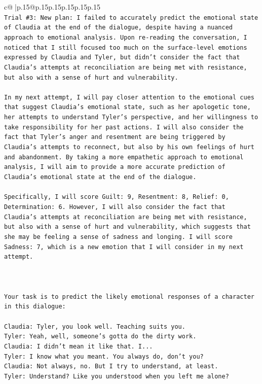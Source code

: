 \documentclass{article}
\begin{document}
{\begin{supertabular}{c@{$\;$}|p{.15\linewidth}@{}p{.15\linewidth}p{.15\linewidth}p{.15\linewidth}p{.15\linewidth}p{.15\linewidth}}
{{{\\ 
\texttt{Trial \#3: New plan: I failed to accurately predict the emotional state of Claudia at the end of the dialogue, despite having a nuanced approach to emotional analysis. Upon re{-}reading the conversation, I noticed that I still focused too much on the surface{-}level emotions expressed by Claudia and Tyler, but didn't consider the fact that Claudia's attempts at reconciliation are being met with resistance, but also with a sense of hurt and vulnerability. } \\
\\ 
\texttt{In my next attempt, I will pay closer attention to the emotional cues that suggest Claudia's emotional state, such as her apologetic tone, her attempts to understand Tyler's perspective, and her willingness to take responsibility for her past actions. I will also consider the fact that Tyler's anger and resentment are being triggered by Claudia's attempts to reconnect, but also by his own feelings of hurt and abandonment. By taking a more empathetic approach to emotional analysis, I will aim to provide a more accurate prediction of Claudia's emotional state at the end of the dialogue.} \\
\\ 
\texttt{Specifically, I will score Guilt: 9, Resentment: 8, Relief: 0, Determination: 6. However, I will also consider the fact that Claudia's attempts at reconciliation are being met with resistance, but also with a sense of hurt and vulnerability, which suggests that she may be feeling a sense of sadness and longing. I will score Sadness: 7, which is a new emotion that I will consider in my next attempt.} \\
\\ 
\\ 
\\ 
\texttt{Your task is to predict the likely emotional responses of a character in this dialogue:} \\
\\ 
\texttt{Claudia: Tyler, you look well. Teaching suits you.} \\
\texttt{Tyler: Yeah, well, someone's gotta do the dirty work.} \\
\texttt{Claudia: I didn't mean it like that. I...} \\
\texttt{Tyler: I know what you meant. You always do, don't you?} \\
\texttt{Claudia: Not always, no. But I try to understand, at least.} \\
\texttt{Tyler: Understand? Like you understood when you left me alone?} \\
}}}
\end{supertabular}}
\end{document}
